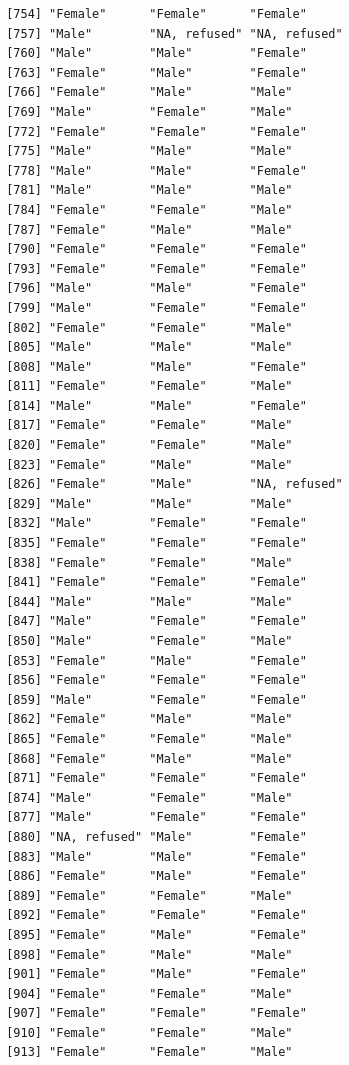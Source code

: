 \documentclass{beamer}\usepackage[]{graphicx}\usepackage[]{color}
\makeatletter
\newenvironment{kframe}{%
 \def\at@end@of@kframe{}%
 \ifinner\ifhmode%
  \def\at@end@of@kframe{\end{minipage}}%
  \begin{minipage}{\columnwidth}%
 \fi\fi%
 \def\FrameCommand##1{\hskip\@totalleftmargin \hskip-\fboxsep
 \colorbox{shadecolor}{##1}\hskip-\fboxsep
     \hskip-\linewidth \hskip-\@totalleftmargin \hskip\columnwidth}%
 \MakeFramed {\advance\hsize-\width
   \@totalleftmargin\z@ \linewidth\hsize
   \@setminipage}}%
 {\par\unskip\endMakeFramed%
 \at@end@of@kframe}
\newenvironment{knitrout}{}{} %
\makeatother
\begin{document}
\begin{frame}[fragile]
\begin{knitrout}
\begin{kframe}
\begin{verbatim}
 [754] "Female"      "Female"      "Female"     
 [757] "Male"        "NA, refused" "NA, refused"
 [760] "Male"        "Male"        "Female"     
 [763] "Female"      "Male"        "Female"     
 [766] "Female"      "Male"        "Male"       
 [769] "Male"        "Female"      "Male"       
 [772] "Female"      "Female"      "Female"     
 [775] "Male"        "Male"        "Male"       
 [778] "Male"        "Male"        "Female"     
 [781] "Male"        "Male"        "Male"       
 [784] "Female"      "Female"      "Male"       
 [787] "Female"      "Male"        "Male"       
 [790] "Female"      "Female"      "Female"     
 [793] "Female"      "Female"      "Female"     
 [796] "Male"        "Male"        "Female"     
 [799] "Male"        "Female"      "Female"     
 [802] "Female"      "Female"      "Male"       
 [805] "Male"        "Male"        "Male"       
 [808] "Male"        "Male"        "Female"     
 [811] "Female"      "Female"      "Male"       
 [814] "Male"        "Male"        "Female"     
 [817] "Female"      "Female"      "Male"       
 [820] "Female"      "Female"      "Male"       
 [823] "Female"      "Male"        "Male"       
 [826] "Female"      "Male"        "NA, refused"
 [829] "Male"        "Male"        "Male"       
 [832] "Male"        "Female"      "Female"     
 [835] "Female"      "Female"      "Female"     
 [838] "Female"      "Female"      "Male"       
 [841] "Female"      "Female"      "Female"     
 [844] "Male"        "Male"        "Male"       
 [847] "Male"        "Female"      "Female"     
 [850] "Male"        "Female"      "Male"       
 [853] "Female"      "Male"        "Female"     
 [856] "Female"      "Female"      "Female"     
 [859] "Male"        "Female"      "Female"     
 [862] "Female"      "Male"        "Male"       
 [865] "Female"      "Female"      "Male"       
 [868] "Female"      "Male"        "Male"       
 [871] "Female"      "Female"      "Female"     
 [874] "Male"        "Female"      "Male"       
 [877] "Male"        "Female"      "Female"     
 [880] "NA, refused" "Male"        "Female"     
 [883] "Male"        "Male"        "Female"     
 [886] "Female"      "Male"        "Female"     
 [889] "Female"      "Female"      "Male"       
 [892] "Female"      "Female"      "Female"     
 [895] "Female"      "Male"        "Female"     
 [898] "Female"      "Male"        "Male"       
 [901] "Female"      "Male"        "Female"     
 [904] "Female"      "Female"      "Male"       
 [907] "Female"      "Female"      "Female"     
 [910] "Female"      "Female"      "Male"       
 [913] "Female"      "Female"      "Male"       

\end{verbatim}
\end{kframe}
\end{knitrout}
\end{frame}
\end{document}
